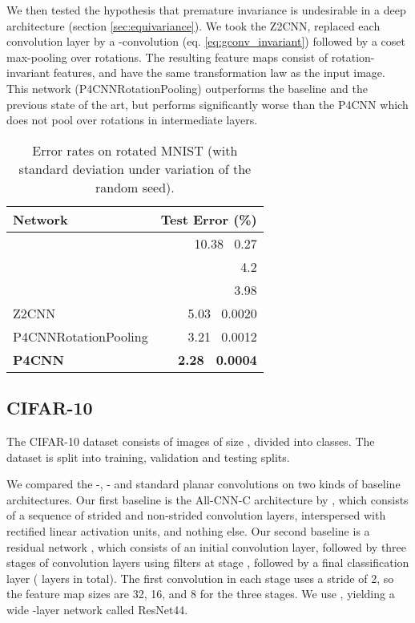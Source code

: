 \documentclass{article}
\newcommand{\rpm}{\raisebox{.2ex}{}}
\begin{document}
We then tested the hypothesis that premature invariance is undesirable in a deep architecture (section \ref{sec:equivariance}).
We took the Z2CNN, replaced each convolution layer by a -convolution (eq. \ref{eq:gconv_invariant}) followed by a coset max-pooling over rotations.
The resulting feature maps consist of rotation-invariant features, and have the same transformation law as the input image.
This network (P4CNNRotationPooling) outperforms the baseline and the previous state of the art, but performs significantly worse than the P4CNN which does not pool over rotations in intermediate layers.

\begin{table}[h!]
  \centering
  \begin{tabular}{l r}
    \hline
    Network & Test Error (\%) \\
    \hline
    \citet{Larochelle2007} & 10.38 \rpm \, 0.27  \\
    \citet{Sohn2012}       & 4.2 \\
    \citet{Schmidt2012}    & 3.98  \\
    \hline
    Z2CNN                  & 5.03 \rpm \, 0.0020 \\
    P4CNNRotationPooling   & 3.21 \rpm \, 0.0012 \\
    \bf{P4CNN}             & \bf{2.28} \rpm \, 0.0004 \\
    \hline 
  \end{tabular}
  \caption{Error rates on rotated MNIST (with standard deviation under variation of the random seed).}
  \label{tbl:mnist_rot_results}
\end{table}


\subsection{CIFAR-10}

The CIFAR-10 dataset consists of  images of size , divided into  classes.
The dataset is split into  training,  validation and  testing splits.

We compared the -, - and standard planar  convolutions on two kinds of baseline architectures.
Our first baseline is the All-CNN-C architecture by \citet{Springenberg2015},
which consists of a sequence of  strided and non-strided convolution layers, interspersed with rectified linear activation units, and nothing else.
Our second baseline is a residual network \cite{He2016}, which consists of an initial convolution layer, followed by three stages of  convolution layers using  filters at stage , followed by a final classification layer ( layers in total).
The first convolution in each stage  uses a stride of 2, so the feature map sizes are 32, 16, and 8 for the three stages.
We use ,  yielding a wide -layer network called ResNet44.
\end{document}
